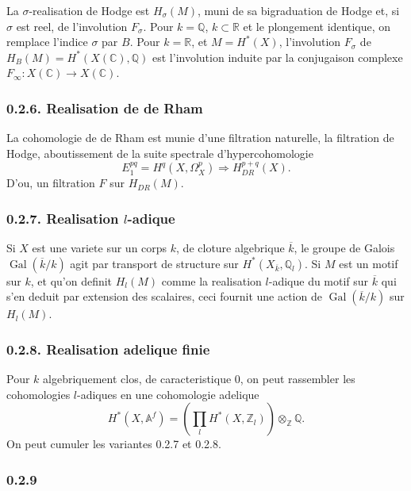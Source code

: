 \documentclass[12pt,a4paper]{article}
\theoremstyle{plain}
\theoremstyle{definition}
\theoremstyle{remark}
\DeclareMathOperator{\Gal}{Gal}
\newcommand{\Q}{\mathbb{Q}}
\newcommand{\R}{\mathbb{R}}
\newcommand{\C}{\mathbb{C}}
\newcommand{\Z}{\mathbb{Z}}
\newcommand{\A}{\mathbb{A}}
\begin{document}
La $\sigma$-realisation de Hodge est $H_\sigma(M)$, muni de sa bigraduation de Hodge et,
si $\sigma$ est reel, de l'involution $F_\sigma$. Pour $k = \Q$, $k \subset \R$ et le plongement
identique, on remplace l'indice $\sigma$ par $B$. Pour $k = \R$, et $M = H^*(X)$, l'involution
$F_\sigma$ de $H_B(M) = H^*(X(\C), \Q)$ est l'involution induite par la conjugaison complexe
$F_\infty: X(\C) \to X(\C)$.

\subsubsection*{0.2.6. Realisation de de Rham}

La cohomologie de de Rham est munie d'une filtration naturelle, la filtration de Hodge,
aboutissement de la suite spectrale d'hypercohomologie
\[
E_1^{pq} = H^q(X, \Omega_X^p) \Rightarrow H_{DR}^{p+q}(X).
\]
D'ou, un filtration $F$ sur $H_{DR}(M)$.

\subsubsection*{0.2.7. Realisation $l$-adique}

Si $X$ est une variete sur un corps $k$, de cloture algebrique $\overline{k}$, le groupe de Galois
$\Gal(\overline{k}/k)$ agit par transport de structure sur $H^*(X_{\overline{k}}, \Q_l)$. Si $M$ est un motif
sur $k$, et qu'on definit $H_l(M)$ comme la realisation $l$-adique du motif sur $\overline{k}$ qui
s'en deduit par extension des scalaires, ceci fournit une action de $\Gal(\overline{k}/k)$ sur $H_l(M)$.

\subsubsection*{0.2.8. Realisation adelique finie}

Pour $k$ algebriquement clos, de caracteristique $0$, on peut rassembler les cohomologies
$l$-adiques en une cohomologie adelique
\[
H^*(X, \A^f) = (\prod_l H^*(X, \Z_l)) \otimes_{\Z} \Q.
\]
On peut cumuler les variantes 0.2.7 et 0.2.8.

\subsubsection*{0.2.9}
\end{document}

